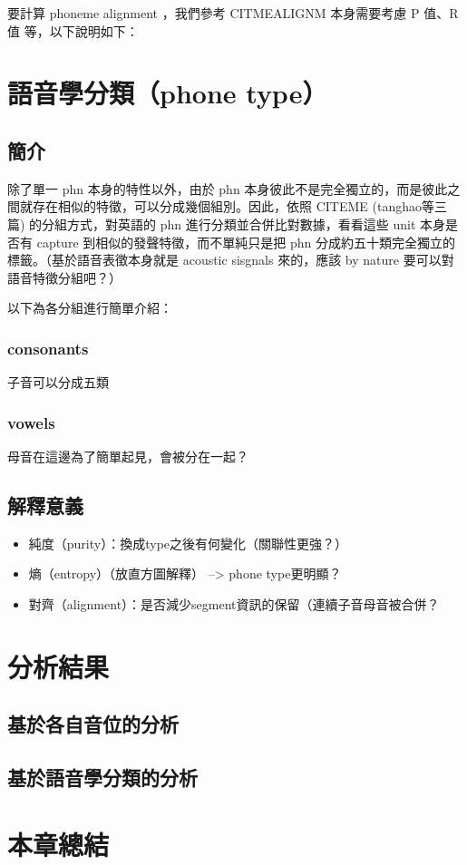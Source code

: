 要計算 phoneme alignment ，我們參考 CITMEALIGNM 本身需要考慮 P 值、R 值 等，以下說明如下：



\section{語音學分類（phone type）}

\subsection{簡介}

除了單一 phn 本身的特性以外，由於 phn 本身彼此不是完全獨立的，而是彼此之間就存在相似的特徵，可以分成幾個組別。因此，依照 CITEME (tanghao等三篇) 的分組方式，對英語的 phn 進行分類並合併比對數據，看看這些 unit 本身是否有 capture 到相似的發聲特徵，而不單純只是把 phn 分成約五十類完全獨立的標籤。（基於語音表徵本身就是 acoustic sisgnals 來的，應該 by nature 要可以對語音特徵分組吧？）

以下為各分組進行簡單介紹：

\subsubsection{consonants}

子音可以分成五類

\subsubsection{vowels}

母音在這邊為了簡單起見，會被分在一起？

\subsection{解釋意義}

\begin{itemize}
    \item 純度（purity）：換成type之後有何變化（關聯性更強？）
    \item 熵（entropy）（放直方圖解釋） --> phone type更明顯？
    \item 對齊（alignment）：是否減少segment資訊的保留（連續子音母音被合併？
\end{itemize}

\section{分析結果}
 
\subsection{基於各自音位的分析}



\subsection{基於語音學分類的分析}
\section{本章總結}
